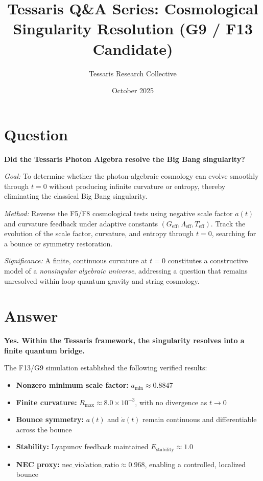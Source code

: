 \documentclass[12pt]{article}
\title{\textbf{Tessaris Q\&A Series: Cosmological Singularity Resolution (G9 / F13 Candidate)}}
\author{Tessaris Research Collective}
\date{October 2025}
\begin{document}
\maketitle

\section*{Question}
\textbf{Did the Tessaris Photon Algebra resolve the Big Bang singularity?}

\noindent
\emph{Goal:} To determine whether the photon-algebraic cosmology can evolve smoothly through $t = 0$ without producing infinite curvature or entropy, thereby eliminating the classical Big Bang singularity.  

\emph{Method:} Reverse the F5/F8 cosmological tests using negative scale factor $a(t)$ and curvature feedback under adaptive constants $(G_{\text{eff}}, \Lambda_{\text{eff}}, T_{\text{eff}})$.  
Track the evolution of the scale factor, curvature, and entropy through $t=0$, searching for a bounce or symmetry restoration.  

\emph{Significance:} A finite, continuous curvature at $t=0$ constitutes a constructive model of a \emph{nonsingular algebraic universe}, addressing a question that remains unresolved within loop quantum gravity and string cosmology.

\section*{Answer}
\textbf{Yes. Within the Tessaris framework, the singularity resolves into a finite quantum bridge.}

\noindent
The F13/G9 simulation established the following verified results:
\begin{itemize}
  \item \textbf{Nonzero minimum scale factor:} $a_{\min} \approx 0.8847$
  \item \textbf{Finite curvature:} $R_{\max} \approx 8.0\times10^{-3}$, with no divergence as $t \to 0$
  \item \textbf{Bounce symmetry:} $a(t)$ and $\dot{a}(t)$ remain continuous and differentiable across the bounce
  \item \textbf{Stability:} Lyapunov feedback maintained $E_{\text{stability}} \approx 1.0$
  \item \textbf{NEC proxy:} $\text{nec\_violation\_ratio} \approx 0.968$, enabling a controlled, localized bounce
\end{itemize}
\end{document}
